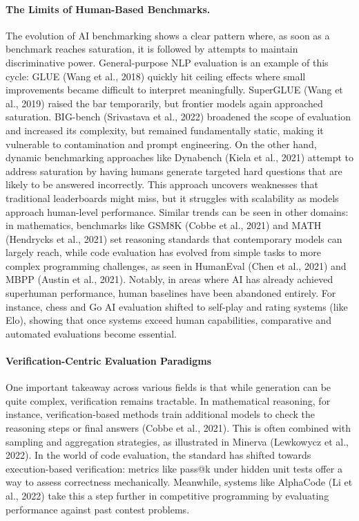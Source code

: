 \documentclass{article} %
\begin{document}
\paragraph{The Limits of Human-Based Benchmarks.}
The evolution of AI benchmarking shows a clear pattern where, as soon as a benchmark reaches saturation, it is followed by attempts to maintain discriminative power. General-purpose NLP evaluation is an example of this cycle: GLUE (Wang et al., 2018) quickly hit ceiling effects where small improvements became difficult to interpret meaningfully. SuperGLUE (Wang et al., 2019) raised the bar temporarily, but frontier models again approached saturation. BIG-bench (Srivastava et al., 2022) broadened the scope of evaluation and increased its complexity, but remained fundamentally static, making it vulnerable to contamination and prompt engineering.
On the other hand, dynamic benchmarking approaches like Dynabench (Kiela et al., 2021) attempt to address saturation by having humans generate targeted hard questions that are likely to be answered incorrectly. This approach uncovers weaknesses that traditional leaderboards might miss, but it struggles with scalability as models approach human-level performance. Similar trends can be seen in other domains: in mathematics, benchmarks like GSM8K (Cobbe et al., 2021) and MATH (Hendrycks et al., 2021) set reasoning standards that contemporary models can largely reach, while code evaluation has evolved from simple tasks to more complex programming challenges, as seen in HumanEval (Chen et al., 2021) and MBPP (Austin et al., 2021).
Notably, in areas where AI has already achieved superhuman performance, human baselines have been abandoned entirely. For instance, chess and Go AI evaluation shifted to self-play and rating systems (like Elo), showing that once systems exceed human capabilities, comparative and automated evaluations become essential.

\paragraph{Verification-Centric Evaluation Paradigms}
One important takeaway across various fields is that while generation can be quite complex, verification remains tractable. In mathematical reasoning, for instance, verification-based methods train additional models to check the reasoning steps or final answers (Cobbe et al., 2021). This is often combined with sampling and aggregation strategies, as illustrated in Minerva (Lewkowycz et al., 2022). In the world of code evaluation, the standard has shifted towards execution-based verification: metrics like pass@k under hidden unit tests offer a way to assess correctness mechanically. Meanwhile, systems like AlphaCode (Li et al., 2022) take this a step further in competitive programming by evaluating performance against past contest problems.
\end{document}
